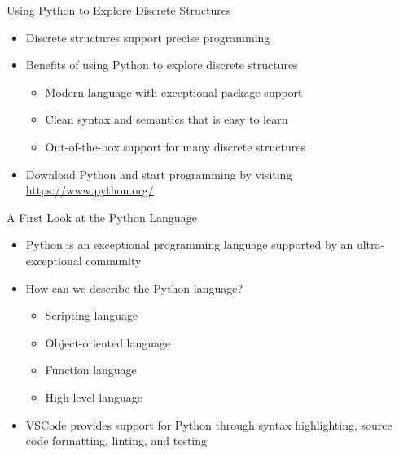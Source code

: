 \documentclass[14pt,aspectratio=169]{beamer}
\begin{document}
%
\begin{frame}{Using Python to Explore Discrete Structures}
  \begin{itemize}
    \item Discrete structures support precise programming
    \item Benefits of using Python to explore discrete structures
      \begin{itemize}
        \item Modern language with exceptional package support
        \item Clean syntax and semantics that is easy to learn
        \item Out-of-the-box support for many discrete structures
      \end{itemize}
    \item Download Python and start programming by visiting
      \url{https://www.python.org/}
  \end{itemize}
\end{frame}

%
\begin{frame}{A First Look at the Python Language}
  \begin{itemize}
    \item Python is an exceptional programming language supported by an
      ultra-exceptional community
      \vspace*{-.15in}
    \item How can we describe the Python language?
      \begin{itemize}
        \item Scripting language
        \item Object-oriented language
        \item Function language
        \item High-level language
      \end{itemize}
      \vspace*{-.15in}
    \item VSCode provides support for Python through syntax highlighting, source
      code formatting, linting, and testing
  \end{itemize}
\end{frame}
\end{document}

